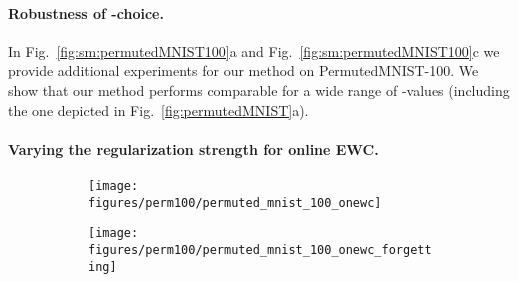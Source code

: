 \documentclass{article}
\begin{document}
\paragraph{Robustness of -choice.}

In Fig.~\ref{fig:sm:permutedMNIST100}a and Fig.~\ref{fig:sm:permutedMNIST100}c we provide additional experiments for our method on PermutedMNIST-100. We show that our method performs comparable for a wide range of -values (including the one depicted in Fig.~\ref{fig:permutedMNIST}a).

\paragraph{Varying the regularization strength for online EWC.}

\begin{figure}
    \centering
    \begin{subfigure}{0.49\linewidth}
    \caption{}
    \texttt{[image: figures/perm100/permuted\_mnist\_100\_onewc]}
    \end{subfigure}
    \begin{subfigure}{0.49\linewidth}
    \caption{}
    \texttt{[image: figures/perm100/permuted\_mnist\_100\_onewc\_forgetting]}
    \end{subfigure}
    

\end{figure}
\end{document}
